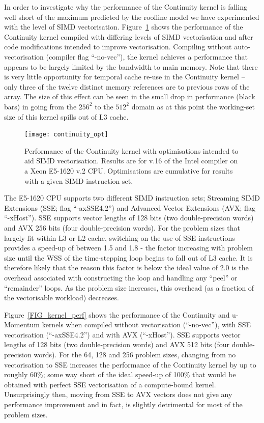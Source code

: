 \documentclass[12pt]{article}
\begin{document}
In order to investigate why the performance of the Continuity kernel
is falling well short of the maximum predicted by the roofline model
we have experimented with the level of SIMD
vectorisation. Figure~\ref{FIG_cont_vec} shows the performance of the
Continuity kernel compiled with differing levels of SIMD vectorisation
and after code modifications intended to improve vectorisation.
Compiling without auto-vectorisation (compiler flag ``-no-vec''), the
kernel achieves a performance that appears to be largely limited by
the bandwidth to main memory. Note that there is very little
opportunity for temporal cache re-use in the Continuity kernel -- only
three of the twelve distinct memory references are to previous rows of
the array. The size of this effect can be seen in the small drop in
performance (black bars) in going from the $256^2$ to the $512^2$
domain as at this point the working-set size of this kernel spills out
of L3 cache.

\begin{figure}
  \centering
  \texttt{[image: continuity\_opt]}
  \caption{Performance of the Continuity kernel with optimisations
    intended to aid SIMD vectorisation. Results are for v.16 of the
    Intel compiler on a Xeon E5-1620 v.2 CPU. Optimisations are
    cumulative for results with a given SIMD instruction set.}
  \label{FIG_cont_vec}
\end{figure}

The E5-1620 CPU supports two different SIMD instruction sets;
Streaming SIMD Extensions (SSE; flag ``-axSSE4.2'') and Advanced
Vector Extensions (AVX; flag ``-xHost''). SSE supports vector lengths
of 128 bits (two double-precision words) and AVX 256 bits (four
double-precision words). For the problem sizes that largely fit within
L3 or L2 cache, switching on the use of SSE instructions provides a
speed-up of between 1.5 and 1.8 - the factor increasing with problem
size until the WSS of the time-stepping loop begins to fall out of L3
cache. It is therefore likely that the reason this factor is below the
ideal value of 2.0 is the overhead associated with constructing the
loop and handling any ``peel'' or ``remainder'' loops. As the problem
size increases, this overhead (as a fraction of the vectorisable
workload) decreases.

Figure~\ref{FIG_kernel_perf} shows the performance of the Continuity
and u-Momentum kernels when compiled without vectorisation
(``-no-vec''), with SSE vectorisation (``-axSSE4.2'') and with AVX
(``-xHost''). SSE supports vector lengths of 128 bits (two
double-precision words) and AVX 512 bits (four double-precision
words). For the 64, 128 and 256 problem sizes, changing from no
vectorisation to SSE increases the performance of the Continuity
kernel by up to roughly 60\%; some way short of the ideal speed-up of
100\% that would be obtained with perfect SSE vectorisation of a
compute-bound kernel. Unsurprisingly then, moving from SSE to AVX
vectors does not give any performance improvement and in fact, is
slightly detrimental for most of the problem sizes.
\end{document}
